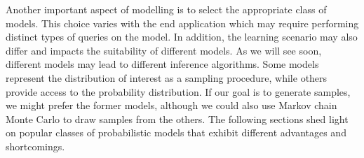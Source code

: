 Another important aspect of modelling is to select the appropriate class of models. This choice varies with the end application which may require performing distinct types of queries on the model. In addition, the learning scenario may also differ and impacts the suitability of different models. As we will see soon, different models may lead to different inference algorithms. Some models represent the distribution of interest as a sampling procedure, while others provide access to the probability distribution. If our goal is to generate samples, we might prefer the former models, although we could also use Markov chain Monte Carlo to draw samples from the others. The following sections shed light on popular classes of probabilistic models that exhibit different advantages and shortcomings.

